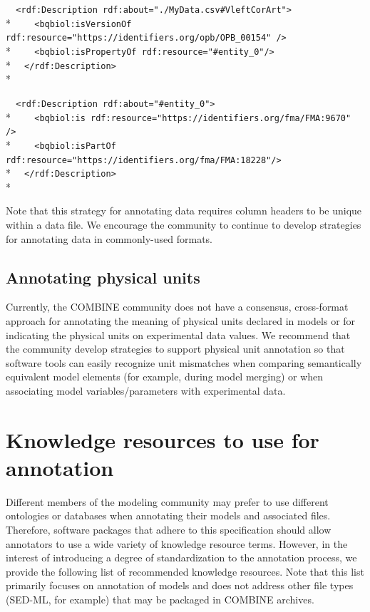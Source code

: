 \documentclass[pdftex,rgb,dvipsnames,svgnames,hyperref,table]{report}
\begin{document}
  \verb|  <rdf:Description rdf:about="./MyData.csv#VleftCorArt">|\\*
  \verb|    <bqbiol:isVersionOf rdf:resource="https://identifiers.org/opb/OPB_00154" />|\\*
  \verb|    <bqbiol:isPropertyOf rdf:resource="#entity_0"/>|\\*
  \verb|  </rdf:Description>|\\*

  \verb|  <rdf:Description rdf:about="#entity_0">|\\*
  \verb|    <bqbiol:is rdf:resource="https://identifiers.org/fma/FMA:9670" />|\\*
  \verb|    <bqbiol:isPartOf rdf:resource="https://identifiers.org/fma/FMA:18228"/>|\\*
  \verb|  </rdf:Description>|\\*
  
Note that this strategy for annotating data requires column headers to be unique within a data file. We encourage the community to continue to develop strategies for annotating data in commonly-used formats.

\subsection{Annotating physical units}
Currently, the COMBINE community does not have a consensus, cross-format approach for annotating the meaning of physical units declared in models or for indicating the physical units on experimental data values. We recommend that the community develop strategies to support physical unit annotation so that software tools can easily recognize unit mismatches when comparing semantically equivalent model elements (for example, during model merging) or when associating model variables/parameters with experimental data.

\section{Knowledge resources to use for annotation}
Different members of the modeling community may prefer to use different ontologies or databases when annotating their models and associated files. Therefore, software packages that adhere to this specification should allow annotators to use a wide variety of knowledge resource terms. However, in the interest of introducing a degree of standardization to the annotation process, we provide the following list of recommended knowledge resources. Note that this list primarily focuses on annotation of models and does not address other file types (SED-ML, for example) that may be packaged in COMBINE archives. 
\end{document}

